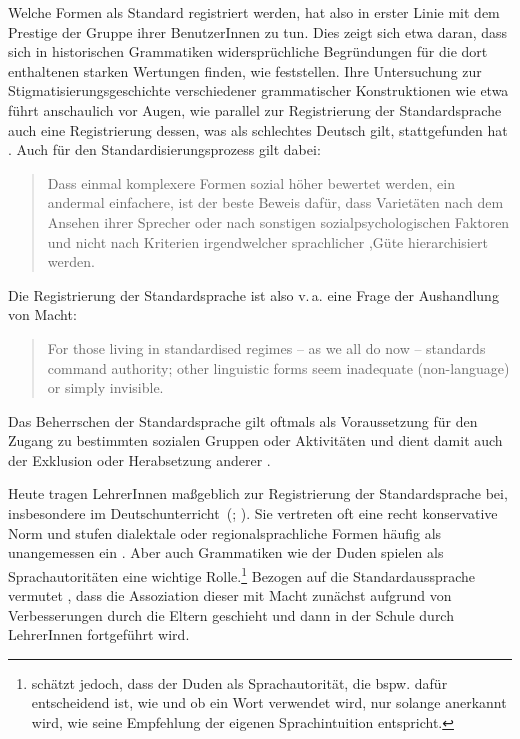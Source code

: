 Welche Formen als Standard registriert werden, hat also in erster Linie mit dem Prestige der Gruppe ihrer BenutzerInnen zu tun. 
Dies zeigt sich etwa daran, dass sich in historischen Grammatiken widersprüchliche Begründungen für die dort enthaltenen starken Wertungen finden, wie \citet[157]{Davies.2006} feststellen. 
Ihre Untersuchung zur Stigmatisierungsgeschichte verschiedener grammatischer Konstruktionen wie etwa  führt anschaulich vor Augen, wie parallel zur Registrierung der Standardsprache auch eine Registrierung dessen, was als \glqq schlechtes Deutsch\grqq{} gilt, stattgefunden hat \citep[s.][]{Davies.2006}.
Auch für den Standardisierungsprozess gilt dabei: 
\begin{quote}Dass einmal komplexere Formen sozial h{\"o}her bewertet werden, ein andermal einfachere, ist der beste Beweis daf{\"u}r, dass Variet{\"a}ten nach dem Ansehen ihrer Sprecher oder nach sonstigen sozialpsychologischen Faktoren und nicht nach Kriterien irgendwelcher sprachlicher ,G{\"u}te{\grq} hierarchisiert werden.~\citep[527]{Harnisch.2005}\end{quote}
Die Registrierung der Standardsprache ist also v.\,a. eine Frage der Aushandlung von Macht: 
\begin{quote}For those living in standardised regimes -- as we all do now -- standards command authority; other linguistic forms seem inadequate (non-language) or simply invisible. \citep[164]{Gal.2016}\end{quote} 
Das Beherrschen der Standardsprache gilt oftmals als Voraussetzung für den Zugang zu bestimmten sozialen Gruppen oder Aktivitäten und dient damit auch der Exklusion oder Herabsetzung anderer \citep[s.][12]{Cameron1995}. 

Heute tragen LehrerInnen maßgeblich zur Registrierung der Standardsprache bei, insbesondere im Deutschunterricht~(\citealp[s.][133]{Davies.2000}; \citealp[328]{Langer.}). 
Sie vertreten oft eine recht konservative Norm und stufen dialektale oder regionalsprachliche Formen häufig als unangemessen ein \citep[s.][129--130]{Davies.2000}. 
Aber auch Grammatiken wie der Duden spielen als Sprachautoritäten eine wichtige Rolle.\footnote{\citet[328]{Langer.} sch{\"a}tzt jedoch, dass der Duden als Sprachautorit{\"a}t, die bspw. daf{\"u}r entscheidend ist, wie und ob ein Wort verwendet wird, nur solange anerkannt wird, wie seine Empfehlung der eigenen Sprachintuition entspricht.}
Bezogen auf die Standardaussprache vermutet \citet[16]{Eckert.2011}, dass die Assoziation dieser mit Macht zunächst aufgrund von Verbesserungen durch die Eltern geschieht und dann in der Schule durch LehrerInnen fortgeführt wird. %

